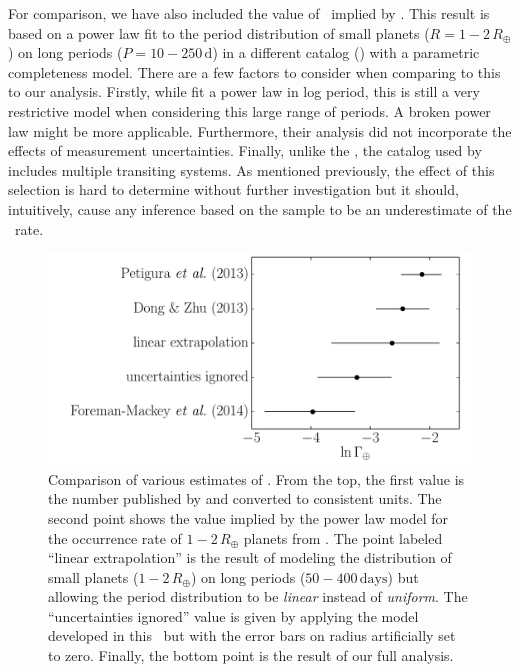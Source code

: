 For comparison, we have also included the value of \gammaearth\ implied by
\citet[][their Table 2]{Dong:2013}.
This result is based on a power law fit to the period distribution of small
planets ($R=1-2\,R_\oplus$) on long periods ($P=10-250\,\mathrm{d}$) in a
different catalog (\citealt{Batalha:2013}) with a parametric completeness
model.
There are a few factors to consider when comparing to this to our analysis.
Firstly, while \citet{Dong:2013} fit a power law in log period, this is still a
very restrictive model when considering this large range of periods.
A broken power law might be more applicable.
Furthermore, their analysis did not incorporate the effects of measurement
uncertainties.
Finally, unlike the \citet{Petigura:2013}, the \citet{Batalha:2013} catalog used
by \citet{Dong:2013} includes multiple transiting systems.
As mentioned previously, the effect of this selection is hard to determine
without further investigation but it should, intuitively, cause any inference
based on the \citet{Petigura:2013} sample to be an underestimate of the \True\
rate.

\begin{figure}[p]
\begin{center}
\includegraphics[width=\textwidth]{figures/exopop/comparison.pdf}
\end{center}
\caption[Comparison to literature values for the rate of Earth analogs]{%
Comparison of various estimates of \gammaearth.
From the top, the first value is the number published by \citet{Petigura:2013} and
converted to consistent units.
The second point shows the value implied by the power law model for the
occurrence rate of $1-2\,R_\oplus$ planets from \citet{Dong:2013}.
The point labeled ``linear extrapolation'' is the result of modeling the
distribution of small planets ($1-2\,R_\oplus$) on long periods
($50-400\,\mathrm{days}$) but allowing the period distribution to be
\emph{linear} instead of \emph{uniform}.
The ``uncertainties ignored'' value is given by applying the model
developed in this \paper\ but with the error bars on radius artificially
set to zero.
Finally, the bottom point is the result of our full analysis.
}
\end{figure}

